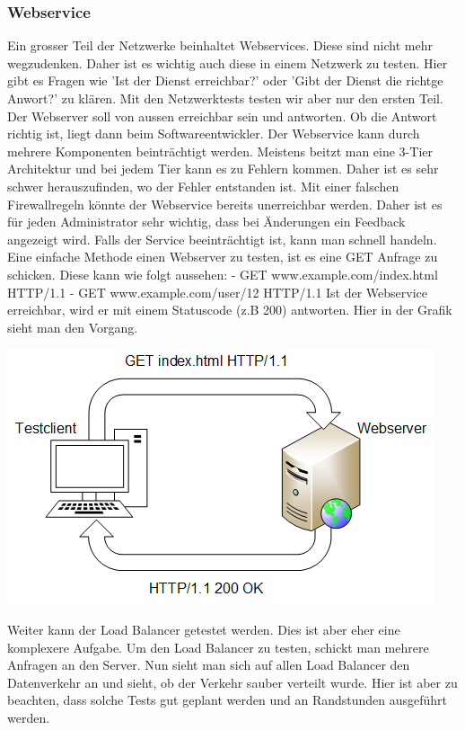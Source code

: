 \documentclass[a4,12pt]{scrartcl}
\begin{document}
\subsubsection{Webservice}
Ein grosser Teil der Netzwerke beinhaltet Webservices. Diese sind nicht mehr wegzudenken. Daher ist es wichtig auch diese in einem Netzwerk zu testen. Hier gibt es Fragen wie 'Ist der Dienst erreichbar?' oder 'Gibt der Dienst die richtge Anwort?' zu klären. Mit den Netzwerktests testen wir aber nur den ersten Teil. Der Webserver soll von aussen erreichbar sein und antworten. Ob die Antwort richtig ist, liegt dann beim Softwareentwickler.\newline\newline
Der Webservice kann durch mehrere Komponenten beinträchtigt werden. Meistens beitzt man eine 3-Tier Architektur und bei jedem Tier kann es zu Fehlern kommen. Daher ist es sehr schwer herauszufinden, wo der Fehler entstanden ist. Mit einer falschen Firewallregeln könnte der Webservice bereits unerreichbar werden. Daher ist es für jeden Administrator sehr wichtig, dass bei Änderungen ein Feedback angezeigt wird. Falls der Service beeinträchtigt ist, kann man schnell handeln.\newline\newline
Eine einfache Methode einen Webserver zu testen, ist es eine GET Anfrage zu schicken. Diese kann wie folgt aussehen:\newline
- GET www.example.com/index.html HTTP/1.1 \newline
- GET www.example.com/user/12 HTTP/1.1 \newline
Ist der Webservice erreichbar, wird er mit einem Statuscode (z.B 200) antworten. Hier in der Grafik sieht man den Vorgang.
\begin{center}
\includegraphics[scale=1]{figures/httpget.png}
\end{center}
Weiter kann der Load Balancer getestet werden. Dies ist aber eher eine komplexere Aufgabe. Um den Load Balancer zu testen, schickt man mehrere Anfragen an den Server. Nun sieht man sich auf allen Load Balancer den Datenverkehr an und sieht, ob der Verkehr sauber verteilt wurde. Hier ist aber zu beachten, dass solche Tests gut geplant werden und an Randstunden ausgeführt werden.\\
\end{document}
